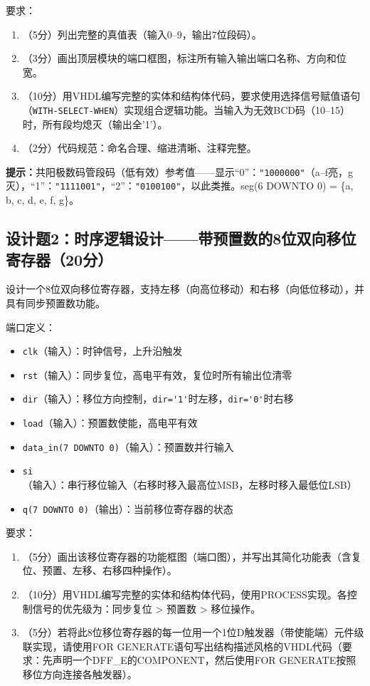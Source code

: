 要求：
\begin{enumerate}[label=(\arabic*)]
  \item （5分）列出完整的真值表（输入0--9，输出7位段码）。
  \item （3分）画出顶层模块的端口框图，标注所有输入输出端口名称、方向和位宽。
  \item （10分）用VHDL编写完整的实体和结构体代码，要求使用选择信号赋值语句（\verb|WITH-SELECT-WHEN|）实现组合逻辑功能。当输入为无效BCD码（10--15）时，所有段均熄灭（输出全'1'）。
  \item （2分）代码规范：命名合理、缩进清晰、注释完整。
\end{enumerate}

\begin{framed}
\textbf{提示：}共阳极数码管段码（低有效）参考值——显示“0”：\verb|"1000000"|（a--f亮，g灭），“1”：\verb|"1111001"|，“2”：\verb|"0100100"|，以此类推。seg(6 DOWNTO 0) = \{a, b, c, d, e, f, g\}。
\end{framed}

\subsection*{设计题2：时序逻辑设计——带预置数的8位双向移位寄存器（20分）}

设计一个8位双向移位寄存器，支持左移（向高位移动）和右移（向低位移动），并具有同步预置数功能。

端口定义：
\begin{itemize}
  \item \verb|clk|（输入）：时钟信号，上升沿触发
  \item \verb|rst|（输入）：同步复位，高电平有效，复位时所有输出位清零
  \item \verb|dir|（输入）：移位方向控制，\verb|dir='1'|时左移，\verb|dir='0'|时右移
  \item \verb|load|（输入）：预置数使能，高电平有效
  \item \verb|data_in(7 DOWNTO 0)|（输入）：预置数并行输入
  \item \verb|si|（输入）：串行移位输入（右移时移入最高位MSB，左移时移入最低位LSB）
  \item \verb|q(7 DOWNTO 0)|（输出）：当前移位寄存器的状态
\end{itemize}

要求：
\begin{enumerate}[label=(\arabic*)]
  \item （5分）画出该移位寄存器的功能框图（端口图），并写出其简化功能表（含复位、预置、左移、右移四种操作）。
  \item （10分）用VHDL编写完整的实体和结构体代码，使用PROCESS实现。各控制信号的优先级为：同步复位 > 预置数 > 移位操作。
  \item （5分）若将此8位移位寄存器的每一位用一个1位D触发器（带使能端）元件级联实现，请使用FOR GENERATE语句写出结构描述风格的VHDL代码（要求：先声明一个DFF\_E的COMPONENT，然后使用FOR GENERATE按照移位方向连接各触发器）。
\end{enumerate}

